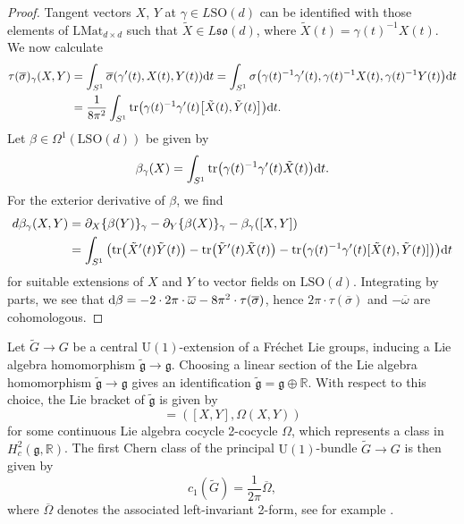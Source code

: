 \documentclass[pdftex]{sigma}
\numberwithin{equation}{section}
\newcommand{\R}{\mathbb{R}}
\newcommand{\tr}{\mathrm{tr}}
\newcommand{\SO}{\mathrm{SO}}
\newcommand{\U}{\mathrm{U}}
\renewcommand{\L}{\mathrm{L}}
\begin{document}
\begin{proof}
Tangent vectors $X$, $Y$ at $\gamma \in L\SO(d)$ can be identified with those elements of $\L \mathrm{Mat}_{d\times d}$ such that $\tilde{X} \in L\mathfrak{so}(d)$, where $\tilde{X}(t) = \gamma(t)^{-1}X(t)$. We now calculate
 \begin{align*}
 \tau(\overline{\sigma})_\gamma(X, Y)
 &= \int_{S^1} \overline{\sigma}(\gamma^\prime(t), X(t), Y(t)) {\rm d}t= \int_{S^1} \sigma\big( \gamma(t)^{-1}\gamma^\prime(t), \gamma(t)^{-1} X(t), \gamma(t)^{-1}Y(t)\big) {\rm d}t\\
 &= \frac{1}{8 \pi^2}\int_{S^1}\tr\big(\gamma(t)^{-1}\gamma^\prime(t) \big[\tilde{X}(t), \tilde{Y}(t)\big]\big) {\rm d}t.
 \end{align*}
 Let $\beta \in \Omega^1(\L\SO(d))$ be given by
 \begin{equation*}
 \beta_\gamma(X) = \int_{S^1} \tr \big( 	\gamma(t)^{-1}\gamma^\prime(t) \tilde{X}(t)\big) {\rm d}t.
 \end{equation*}
For the exterior derivative of $\beta$, we find
 \begin{align*}
 d\beta_\gamma(X, Y) &= \partial_X \{ \beta(Y)\}_\gamma - \partial_Y \{ \beta(X)\}_\gamma - \beta_\gamma([X, Y]) \\
 &= \int_{S^1} \big( \tr \big(\tilde{X}^\prime(t) \tilde{Y}(t)\big) - \tr \big(\tilde{Y}^\prime(t) \tilde{X}(t)\big) - \tr\big(\gamma(t)^{-1}\gamma^\prime(t) [\tilde{X}(t), \tilde{Y}(t)]\big)\big) {\rm d}t
 \end{align*}
 for suitable extensions of $X$ and $Y$ to vector fields on $\L\SO(d)$.
 Integrating by parts, we see that ${\rm d} \beta = - 2 \cdot 2\pi \cdot \overline{\omega} - 8 \pi^2 \cdot \tau(\overline{\sigma})$, hence $2 \pi \cdot \tau(\overline{\sigma})$ and $-\overline{\omega}$ are cohomologous.
\end{proof}

Let $\tilde{G} \to G$ be a central $\U(1)$-extension of a Fr\'echet Lie groups, inducing a Lie algebra homomorphism $\tilde{\mathfrak{g}} \to \mathfrak{g}$.
Choosing a linear section of the Lie algebra homomorphism $\tilde{\mathfrak{g}} \to \mathfrak{g}$ gives an identification $\tilde{\mathfrak{g}} = \mathfrak{g} \oplus \R$.
With respect to this choice, the Lie bracket of $\tilde{\mathfrak{g}}$ is given by
\begin{equation*}
 	[(X, \lambda), (Y, \mu)] = ([X, Y], \Omega(X, Y))
\end{equation*}
for some continuous Lie algebra cocycle 2-cocycle $\Omega$, which represents a class in $H^2_c(\mathfrak{g}, \R)$.
The first Chern class of the principal $\U(1)$-bundle $\tilde{G} \to G$ is then given by
\begin{equation}
\label{ChernClassVsCocycle}
 c_1(\tilde{G}) = \frac{1}{2\pi} \overline{\Omega}, 	
\end{equation}
where $\overline{\Omega}$ denotes the associated left-invariant 2-form, see for example \cite[Proposition~4.5.6]{PressleySegal}.
\end{document}
